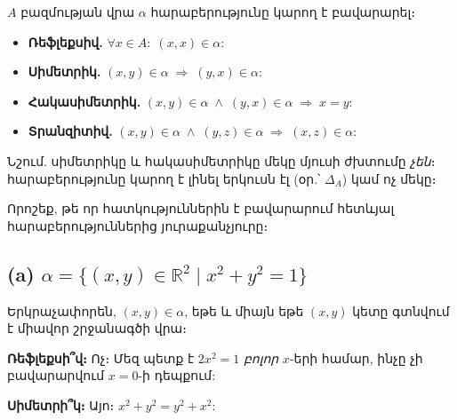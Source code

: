 \documentclass[12pt, a4paper]{article}
\newcommand{\R}{\mathbb{R}}
\begin{document}
\begin{theorybox}
$A$ բազմության վրա $\alpha$ հարաբերությունը կարող է բավարարել։
\begin{itemize}[nosep]
  \item \textbf{Ռեֆլեքսիվ.} $\forall x \in A:\; (x,x) \in \alpha$:
  \item \textbf{Սիմետրիկ.} $(x,y) \in \alpha \;\Rightarrow\; (y,x) \in \alpha$:
  \item \textbf{Հակասիմետրիկ.} $(x,y) \in \alpha \;\land\; (y,x) \in \alpha \;\Rightarrow\; x = y$:
  \item \textbf{Տրանզիտիվ.} $(x,y) \in \alpha \;\land\; (y,z) \in \alpha \;\Rightarrow\; (x,z) \in \alpha$:
\end{itemize}
Նշում. սիմետրիկը և հակասիմետրիկը մեկը մյուսի ժխտումը \emph{չեն}։ հարաբերությունը կարող է լինել երկուսն էլ (օր.՝ $\Delta_A$) կամ ոչ մեկը։
\end{theorybox}

\begin{problembox}
Որոշեք, թե որ հատկություններին է բավարարում հետևյալ հարաբերություններից յուրաքանչյուրը։
\end{problembox}

\subsection*{(a)\; $\alpha = \{(x,y) \in \R^2 \mid x^2 + y^2 = 1\}$}

Երկրաչափորեն, $(x,y) \in \alpha$, եթե և միայն եթե $(x,y)$ կետը գտնվում է միավոր շրջանագծի վրա։

\begin{center}
\end{center}

\textbf{Ռեֆլեքսի՞վ։} Ոչ։ Մեզ պետք է $2x^2 = 1$ \emph{բոլոր} $x$-երի համար, ինչը չի բավարարվում $x = 0$-ի դեպքում:

\textbf{Սիմետրի՞կ։} Այո։ $x^2 + y^2 = y^2 + x^2$: \checkmark
\end{document}
